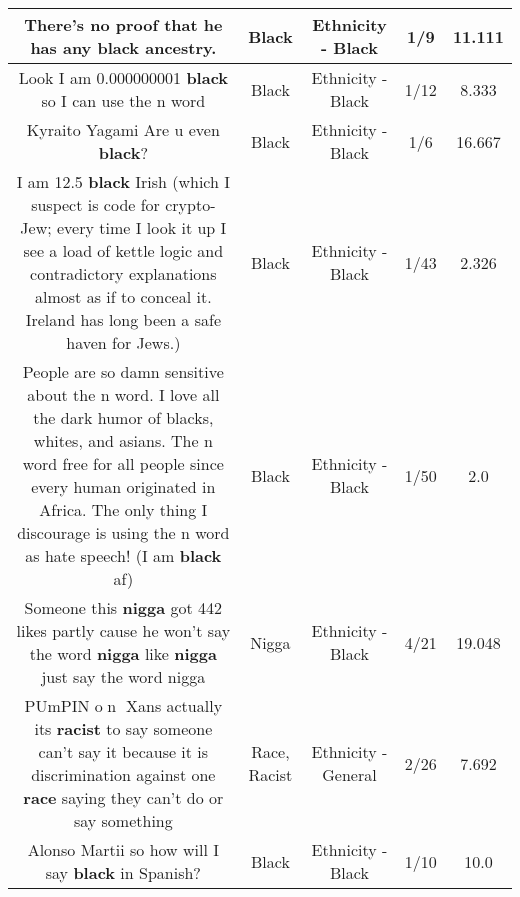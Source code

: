 \documentclass[11pt]{article}
\newlength\mylength
\begin{document}
\begin{center}
\begin{longtable}{|C{.65\mylength}|C{.30\mylength}|C{.12\mylength}|C{.12\mylength}|C{.12\mylength}|}
  \small There's no proof that he has any \textbf{black} ancestry.\normalsize   & Black & Ethnicity - Black & 1/9 & 11.111 \\  \hline
  \small Look I am 0.000000001 \textbf{black} so I can use the n word\normalsize   & Black & Ethnicity - Black & 1/12 & 8.333 \\  \hline
  \small Kyraito Yagami Are u even \textbf{black}?\normalsize   & Black & Ethnicity - Black & 1/6 & 16.667 \\  \hline
  \small I am 12.5 \textbf{black} Irish (which I suspect is code for crypto-Jew; every time I look it up I see a load of kettle logic and contradictory explanations almost as if to conceal it.  Ireland has long been a safe haven for Jews.)\normalsize   & Black & Ethnicity - Black & 1/43 & 2.326 \\  \hline
  \small People are so damn sensitive about the n word. I love all the dark humor of blacks, whites, and asians. The n word free for all people since every human originated in Africa. The only thing I discourage is using the n word as hate speech! (I am \textbf{black} af)\normalsize   & Black & Ethnicity - Black & 1/50 & 2.0 \\  \hline
  \small Someone this \textbf{nigga} got 442 likes partly cause he won't say the word \textbf{nigga} like \textbf{nigga} just say the word nigga\normalsize   & Nigga & Ethnicity - Black & 4/21 & 19.048 \\  \hline
  \small PUmPIN o⃣n⃣ Xans actually its \textbf{racist} to say someone can't say it because it is discrimination against one \textbf{race} saying they can't do or say something\normalsize   & Race, Racist & Ethnicity - General & 2/26 & 7.692 \\  \hline
  \small Alonso Martii so how will I say \textbf{black} in Spanish?\normalsize   & Black & Ethnicity - Black & 1/10 & 10.0 \\  \hline

\end{longtable}
\end{center}
\end{document}
